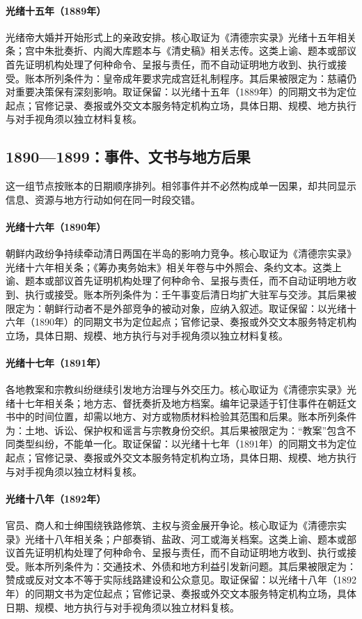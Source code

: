 \hypertarget{ledger:EQ-1889-GUANGXU-MARRIAGE}{}\paragraph{光绪十五年（1889年）}光绪帝大婚并开始形式上的亲政安排。核心取证为《清德宗实录》光绪十五年相关条；宫中朱批奏折、内阁大库题本与《清史稿》相关志传。这类上谕、题本或部议首先证明机构处理了何种命令、呈报与责任，而不自动证明地方收到、执行或接受。账本所列条件为：皇帝成年要求完成宫廷礼制程序。其后果被限定为：慈禧仍对重要决策保有深刻影响。取证保留：以光绪十五年（1889年）的同期文书为定位起点；官修记录、奏报或外交文本服务特定机构立场，具体日期、规模、地方执行与对手视角须以独立材料复核。
\subsection{1890—1899：事件、文书与地方后果}
这一组节点按账本的日期顺序排列。相邻事件并不必然构成单一因果，却共同显示信息、资源与地方行动如何在同一时段交错。
\hypertarget{ledger:EQ-1890-KOREAN-POLITICAL-CONFLICT}{}\paragraph{光绪十六年（1890年）}朝鲜内政纷争持续牵动清日两国在半岛的影响力竞争。核心取证为《清德宗实录》光绪十六年相关条；《筹办夷务始末》相关年卷与中外照会、条约文本。这类上谕、题本或部议首先证明机构处理了何种命令、呈报与责任，而不自动证明地方收到、执行或接受。账本所列条件为：壬午事变后清日均扩大驻军与交涉。其后果被限定为：朝鲜行动者不是外部竞争的被动对象，应纳入叙述。取证保留：以光绪十六年（1890年）的同期文书为定位起点；官修记录、奏报或外交文本服务特定机构立场，具体日期、规模、地方执行与对手视角须以独立材料复核。
\hypertarget{ledger:EQ-1891-MISSIONARY-CONFLICTS}{}\paragraph{光绪十七年（1891年）}各地教案和宗教纠纷继续引发地方治理与外交压力。核心取证为《清德宗实录》光绪十七年相关条；地方志、督抚奏折及地方档案。编年记录适于钉住事件在朝廷文书中的时间位置，却需以地方、对方或物质材料检验其范围和后果。账本所列条件为：土地、诉讼、保护权和谣言与宗教身份交织。其后果被限定为：“教案”包含不同类型纠纷，不能单一化。取证保留：以光绪十七年（1891年）的同期文书为定位起点；官修记录、奏报或外交文本服务特定机构立场，具体日期、规模、地方执行与对手视角须以独立材料复核。
\hypertarget{ledger:EQ-1892-RAILWAY-DEBATE}{}\paragraph{光绪十八年（1892年）}官员、商人和士绅围绕铁路修筑、主权与资金展开争论。核心取证为《清德宗实录》光绪十八年相关条；户部奏销、盐政、河工或海关档案。这类上谕、题本或部议首先证明机构处理了何种命令、呈报与责任，而不自动证明地方收到、执行或接受。账本所列条件为：交通技术、外债和地方利益引发新问题。其后果被限定为：赞成或反对文本不等于实际线路建设和公众意见。取证保留：以光绪十八年（1892年）的同期文书为定位起点；官修记录、奏报或外交文本服务特定机构立场，具体日期、规模、地方执行与对手视角须以独立材料复核。
